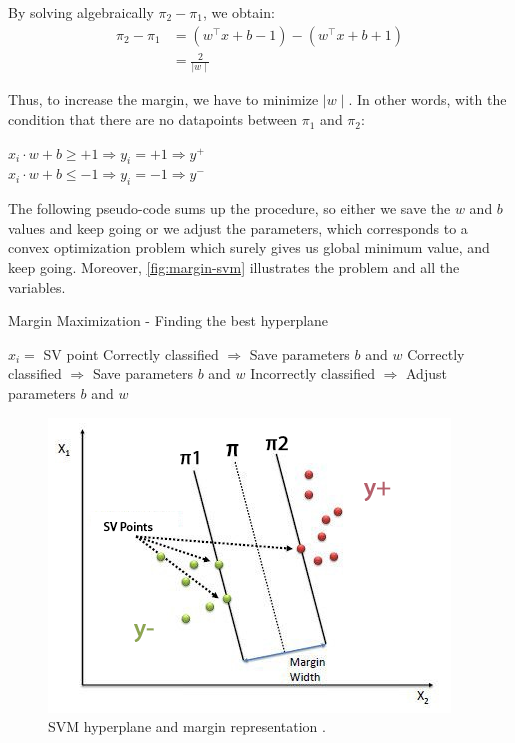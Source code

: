 \documentclass[11pt, openany]{report}
\theoremstyle{plain}
\theoremstyle{definition}
\theoremstyle{remark}
\begin{document}
By solving algebraically $\pi_{2}-\pi_{1}$, we obtain:
\begin{align}
\pi_{2}-\pi_{1} &= (w^\top x + b - 1) - (w^\top x + b + 1)\nonumber  \\ 
 				&= \frac{2}{\mid w \mid} \nonumber
\end{align} 

Thus, to increase the margin, we have to minimize $\mid w \mid$. In other words, with the condition that there are no datapoints between $\pi_{1}$ and $\pi_{2}$:
\begin{center}
$ x_{i} \cdot w + b \geq +1 \Rightarrow y_{i} = +1 \Rightarrow y^{+} $ \\
$ x_{i} \cdot w + b \leq -1 \Rightarrow y_{i} = -1 \Rightarrow y^{-} $
\end{center}

The following pseudo-code sums up the procedure, so either we save the $w$ and $b$ values and keep going or we adjust the parameters, which corresponds to a convex optimization problem which surely gives us global minimum value, and keep going. Moreover, \autoref{fig:margin-svm} illustrates the problem and all the variables. 
 
\begin{algorithm} 
  \caption{Margin Maximization - Finding the best hyperplane} \label{alg:max-margin}
  \begin{algorithmic}[1]
  \State $x_{i} =$ SV point
  \State Correctly classified $\Rightarrow$ Save parameters $b$ and $w$ 
  \State Correctly classified $\Rightarrow$ Save parameters $b$ and $w$
  \Else 
  \State Incorrectly classified $\Rightarrow$ Adjust parameters $b$ and $w$
  \EndIf 
  \EndFor
  \end{algorithmic}
\end{algorithm}




\begin{figure}[h]
  \centering
  \includegraphics[scale=0.85]{figures/margin-svm.png}
  \caption{SVM hyperplane and margin representation \cite{svm-towardsdatascience}.}
  \label{fig:margin-svm}
\end{figure}
\end{document}
